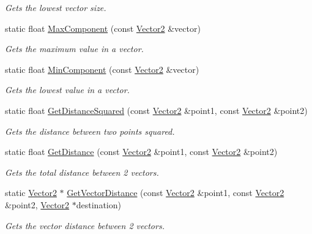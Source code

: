 \begin{DoxyCompactItemize}
\begin{DoxyCompactList}\small\item\em Gets the lowest vector size. \end{DoxyCompactList}\item 
static float \hyperlink{class_flounder_1_1_vector2_a10a9c4f921f9ddddd25e1bbe30f35555}{Max\+Component} (const \hyperlink{class_flounder_1_1_vector2}{Vector2} \&vector)
\begin{DoxyCompactList}\small\item\em Gets the maximum value in a vector. \end{DoxyCompactList}\item 
static float \hyperlink{class_flounder_1_1_vector2_ac40e10c32743c6e147ffdab4552d19c8}{Min\+Component} (const \hyperlink{class_flounder_1_1_vector2}{Vector2} \&vector)
\begin{DoxyCompactList}\small\item\em Gets the lowest value in a vector. \end{DoxyCompactList}\item 
static float \hyperlink{class_flounder_1_1_vector2_ae07d36b33d37e74c2e68fe8c776686eb}{Get\+Distance\+Squared} (const \hyperlink{class_flounder_1_1_vector2}{Vector2} \&point1, const \hyperlink{class_flounder_1_1_vector2}{Vector2} \&point2)
\begin{DoxyCompactList}\small\item\em Gets the distance between two points squared. \end{DoxyCompactList}\item 
static float \hyperlink{class_flounder_1_1_vector2_ace3ca634e386db1bed62a848c3f7b078}{Get\+Distance} (const \hyperlink{class_flounder_1_1_vector2}{Vector2} \&point1, const \hyperlink{class_flounder_1_1_vector2}{Vector2} \&point2)
\begin{DoxyCompactList}\small\item\em Gets the total distance between 2 vectors. \end{DoxyCompactList}\item 
static \hyperlink{class_flounder_1_1_vector2}{Vector2} $\ast$ \hyperlink{class_flounder_1_1_vector2_a61641d327a24ba72813d3d55b197df71}{Get\+Vector\+Distance} (const \hyperlink{class_flounder_1_1_vector2}{Vector2} \&point1, const \hyperlink{class_flounder_1_1_vector2}{Vector2} \&point2, \hyperlink{class_flounder_1_1_vector2}{Vector2} $\ast$destination)
\begin{DoxyCompactList}\small\item\em Gets the vector distance between 2 vectors. \end{DoxyCompactList}\item 

\end{DoxyCompactItemize}
